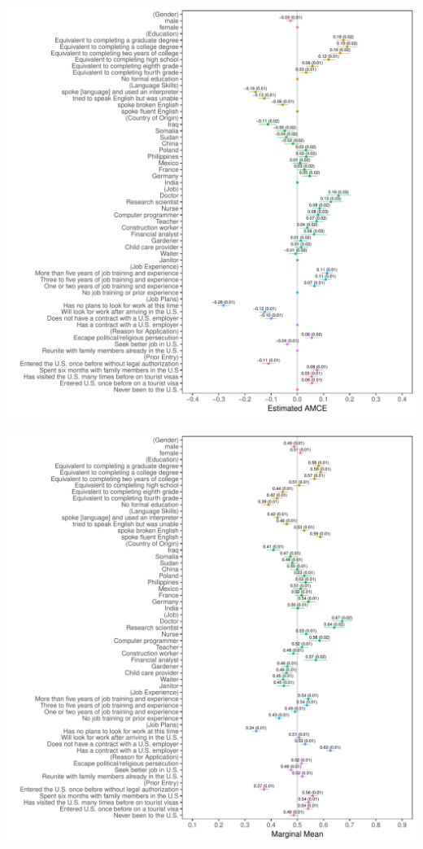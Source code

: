 \documentclass[a4paper,12pt]{article}\usepackage[]{graphicx}\usepackage[]{color}
\makeatletter
\def\maxwidth{ %
  \ifdim\Gin@nat@width>\linewidth
    \linewidth
  \else
    \Gin@nat@width
  \fi
}
\newenvironment{knitrout}{}{} %
\makeatother
\begin{document}
\begin{knitrout}
\color{fgcolor}
\includegraphics[width=\maxwidth]{figure/hainmueller_immigration_amce_appendix-1} 

\includegraphics[width=\maxwidth]{figure/hainmueller_immigration_amce_appendix-2} 

\end{knitrout}
\end{document}
